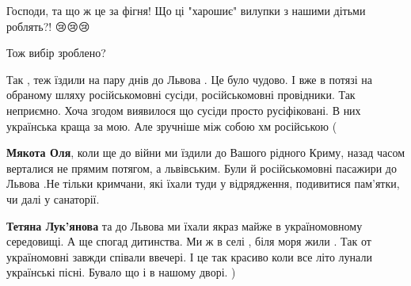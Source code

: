 \begin{itemize}
Господи, та що ж це за фігня! Що ці "харошиє" вилупки з нашими дітьми роблять?! 😢😢😢

 
Тож вибір зроблено?

 

Так , теж їздили на пару днів до Львова . Це було чудово. І вже в потязі на
обраному шляху російськомовні сусіди, російськомовні провідники. Так неприємно.
Хоча згодом виявилося що сусіди просто русіфіковані. В них українська краща за
мою. Але зручніше між собою хм російською (

\begin{itemize}
 
\textbf{Мякота Оля}, коли ще до війни ми їздили до Вашого рідного Криму, назад часом верталися не прямим потягом, а львівським. Були й російськомовні пасажири до Львова .Не тільки кримчани, які їхали туди у відрядження, подивитися пам'ятки, чи далі у санаторії.

 
\textbf{Тетяна Лук'янова} та до Львова ми їхали якраз майже в україномовному середовищі. А ще спогад дитинства. Ми ж в селі , біля моря жили . Так от україномовні завжди співали ввечері. І це так красиво коли все літо лунали українські пісні. Бувало що і в нашому дворі. )

 

\end{itemize}
\end{itemize}

